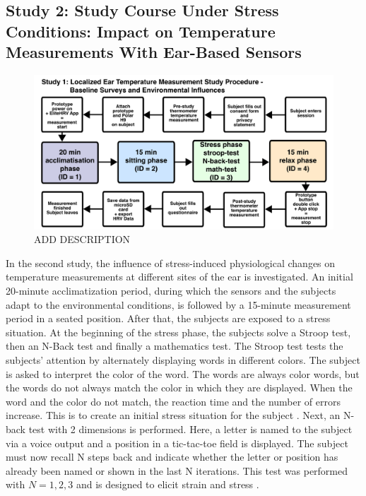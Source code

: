 \subsection{Study 2: Study Course Under Stress Conditions: Impact on Temperature Measurements With Ear-Based Sensors}
\label{ch:Design:Study:Study2}
\begin{figure}[!ht]
    \centering
    \includegraphics[width=\textwidth]{thesis-doc/images/study2/Procedure2_new.pdf}
    \caption{ADD DESCRIPTION}
    \label{fig:design:study2:procedure}
\end{figure}
In the second study, the influence of stress-induced physiological changes on temperature measurements at different sites of the ear is investigated. 
An initial 20-minute acclimatization period, during which the sensors and the subjects adapt to the environmental conditions, is followed by a 15-minute measurement period in a seated position.
After that, the subjects are exposed to a stress situation. 
At the beginning of the stress phase, the subjects solve a Stroop test, then an N-Back test and finally a mathematics test. 
The Stroop test tests the subjects' attention by alternately displaying words in different colors. 
The subject is asked to interpret the color of the word. The words are always color words, but the words do not always match the color in which they are displayed. 
When the word and the color do not match, the reaction time and the number of errors increase. 
This is to create an initial stress situation for the subject \cite{StroopCompetitionSocialEvaluative}. 
Next, an N-back test with 2 dimensions is performed. 
Here, a letter is named to the subject via a voice output and a position in a tic-tac-toe field is displayed. 
The subject must now recall N steps back and indicate whether the letter or position has already been named or shown in the last N iterations. 
This test was performed with $N={1,2,3}$ and is designed to elicit strain and stress \cite{liangEffectAcuteStress2023}.
